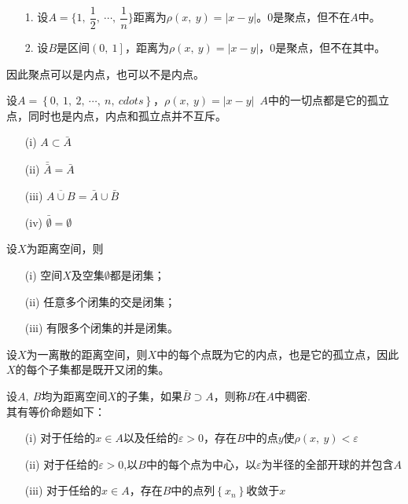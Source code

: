 \begin{newex}
    \begin{itemize}
        \item [1.] 设$A=\big\{1,\ \dfrac{1}{2},\ \cdots ,\ \dfrac{1}{n}   \big\}$距离为$\rho (x,\ y)=|x-y|$。0是聚点，但不在$A$中。
        \item [2.] 设$B$是区间$\left( 0,\ 1  \right]$，距离为$\rho (x,\ y)=|x-y|$，0是聚点，但不在其中。
    \end{itemize}
    因此聚点可以是内点，也可以不是内点。
\end{newex}

\begin{newex}
    设$A=\left\{  0,\ 1,\ 2,\ \cdots ,\ n,\ cdots  \right\}$，$\rho(x,\ y)=|x-y|$\ 
    $A$中的一切点都是它的孤立点，同时也是内点，内点和孤立点并不互斥。
\end{newex}

\begin{newthem}
    \begin{itemize}
        \item [(i)] $A \subset \bar{A}$
        \item [(ii)] $\bar{\bar{A}}=\bar{A}$
        \item [(iii)] $\overline{A \cup B}=\bar{A} \cup \bar{B}$
        \item [(iv)] $\bar{\emptyset }= \emptyset$ 
    \end{itemize}
\end{newthem}

\begin{newthem}
    设$X$为距离空间，则
    \begin{itemize}
        \item [(i)]空间$X$及空集$\emptyset$都是闭集；
        \item [(ii)] 任意多个闭集的交是闭集；
        \item [(iii)] 有限多个闭集的并是闭集。
    \end{itemize}
\end{newthem}

\begin{newex}
    设$X$为一离散的距离空间，则$X$中的每个点既为它的内点，也是它的孤立点，因此$X$的每个子集都是既开又闭的集。
\end{newex}

\begin{newdef}
    设$A,\ B$均为距离空间$X$的子集，如果$\bar{B} \supset A$，则称$B$在$A$中稠密.\\
    其有等价命题如下：
    \begin{itemize}
        \item [(i)] 对于任给的$x \in A$以及任给的$\varepsilon >0$，存在$B$中的点$y$使$\rho (x, \ y) <\varepsilon$
        \item [(ii)] 对于任给的$\varepsilon >0$,以$B$中的每个点为中心，以$\varepsilon$为半径的全部开球的并包含$A$
        \item [(iii)] 对于任给的$x \in A$，存在$B$中的点列$ \left\{ x_n \right\}$收敛于$x$
    \end{itemize}
\end{newdef}

